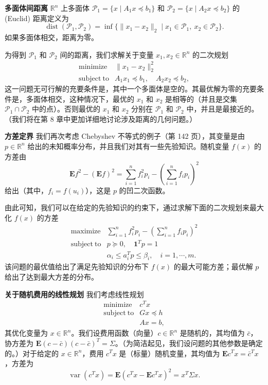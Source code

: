 \documentclass[UTF8,12pt,a4paper,fontset=fandol]{ctexart}
\begin{document}
\noindent\textbf{多面体间距离}\quad
$\mathbb{R}^n$ 上多面体 $\mathcal{P}_1=\{x\mid A_1x\preceq b_1\}$ 和 $\mathcal{P}_2=\{x\mid A_2x\preceq b_2\}$ 的 (Euclid) 距离定义为
\[
\operatorname{dist}(\mathcal{P}_1,\mathcal{P}_2)=\inf\{\|x_1-x_2\|_2\mid x_1\in\mathcal{P}_1,\ x_2\in\mathcal{P}_2\}.
\]
如果多面体相交，距离为零。

为得到 $\mathcal{P}_1$ 和 $\mathcal{P}_2$ 间的距离，我们求解关于变量 $x_1,x_2\in\mathbb{R}^n$ 的二次规划
\[
\begin{array}{ll}
\mathop{\mathrm{minimize}} & \|x_1-x_2\|_2^2\\
\mathrm{subject\ to} & A_1x_1\preceq b_1,\quad A_2x_2\preceq b_2,
\end{array}
\]
这一问题无可行解的充要条件是，其中一个多面体是空的。其最优解为零的充要条件是，多面体相交，这种情况下，最优的 $x_1$ 和 $x_2$ 是相等的（并且是交集 $\mathcal{P}_1\cap\mathcal{P}_2$ 中的点）。否则最优的 $x_1$ 和 $x_2$ 分别在 $\mathcal{P}_1$ 和 $\mathcal{P}_2$ 中，并且是最接近的。（我们将在第 8 章中更加详细地讨论涉及距离的几何问题。）

\noindent\textbf{方差定界}\quad
我们再次考虑 Chebyshev 不等式的例子（第 142 页），其变量是由 $p\in\mathbb{R}^n$ 给出的未知概率分布，并且我们对其有一些先验知识。随机变量 $f(x)$ 的方差由
\[
\mathbf{E}f^2-(\mathbf{E}f)^2=\sum_{i=1}^n f_i^2p_i-\left(\sum_{i=1}^n f_ip_i\right)^2
\]
给出（其中，$f_i=f(u_i)$），这是 $p$ 的凹二次函数。

由此可知，我们可以在给定的先验知识的约束下，通过求解下面的二次规划来最大化 $f(x)$ 的方差
\[
\begin{array}{ll}
\mathop{\mathrm{maximize}} & \displaystyle\sum_{i=1}^n f_i^2p_i-\left(\sum_{i=1}^n f_ip_i\right)^2\\
\mathrm{subject\ to} & p\succeq 0,\quad \mathbf{1}^Tp=1\\
& \alpha_i\leq a_i^Tp\leq \beta_i,\quad i=1,\cdots,m.
\end{array}
\]
该问题的最优值给出了满足先验知识的分布下 $f(x)$ 的最大可能方差；最优解 $p$ 给出了达到最大方差的分布。

\noindent\textbf{关于随机费用的线性规划}\quad
我们考虑线性规划
\[
\begin{array}{ll}
\mathop{\mathrm{minimize}} & c^Tx\\
\mathrm{subject\ to} & Gx\preceq h\\
& Ax=b,
\end{array}
\]
其优化变量为 $x\in\mathbb{R}^n$。我们设费用函数（向量）$c\in\mathbb{R}^n$ 是随机的，其均值为 $\bar c$，协方差为 $\mathbf{E}(c-\bar c)(c-\bar c)^T=\Sigma$。（为简洁起见，我们设问题的其他参数是确定的。）对于给定的 $x\in\mathbb{R}^n$，费用 $c^Tx$ 是（标量）随机变量，其均值为 $\mathbf{E}c^Tx=\bar c^Tx$，方差为
\[
\operatorname{var}(c^Tx)=\mathbf{E}(c^Tx-\mathbf{E}c^Tx)^2=x^T\Sigma x.
\]
\end{document}
